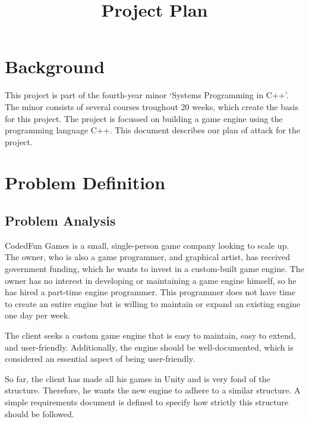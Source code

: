\documentclass{projdoc}
\title{Project Plan}
\begin{document}
\tablestables
\newpage

\section{Background}

This project is part of the fourth-year minor `Systems Programming in C++'. The minor
consists of several courses troughout 20 weeks, which create the basis for this
project. The project is focussed on building a game engine using the programming
language C++. This document describes our plan of attack for the project.

\section{Problem Definition}



\subsection{Problem Analysis}

CodedFun Games is a small, single-person game company looking to scale up. The owner,
who is also a game programmer, and graphical artist, has received government funding,
which he wants to invest in a custom-built game engine. The owner has no interest in
developing or maintaining a game engine himself, so he has hired a part-time engine
programmer. This programmer does not have time to create an entire engine but is
willing to maintain or expand an existing engine one day per week.

The client seeks a custom game engine that is easy to maintain, easy to extend, and
user-friendly. Additionally, the engine should be well-documented, which is
considered an essential aspect of being user-friendly.

So far, the client has made all his games in Unity and is very fond of the structure.
Therefore, he wants the new engine to adhere to a similar structure. A simple
requirements document is defined to specify how strictly this structure should be
followed.
\end{document}
